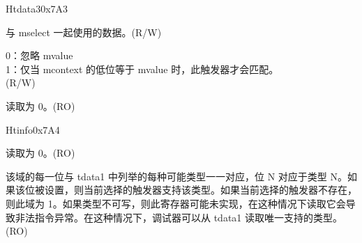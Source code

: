\begin{register}{H}{tdata3}{0x7A3}\label{regdesc:TDATA3}
%
%
%
\regnewline%
\begin{regdesc}\begin{reglist}
\label{fielddesc:MVALUE}\item [mvalue] 与 mselect 一起使用的数据。(R/W)
\label{fielddesc:MSELECT}\item [mselect] 
0：忽略 mvalue\\
1：仅当 mcontext 的低位等于 mvalue 时，此触发器才会匹配。\\
(R/W)
\label{fielddesc:tdata3_rsvd}\item [Reserved] 读取为 0。(RO)
\end{reglist}\end{regdesc}
\end{register}

\begin{register}{H}{tinfo}{0x7A4}\label{regdesc:TINFO}
%
%
\regnewline%
\begin{regdesc}\begin{reglist}
\label{fielddesc:tinfo_rsvd}\item [Reserved] 读取为 0。(RO)
\label{fielddesc:INFO}\item [info] 该域的每一位与 tdata1 中列举的每种可能类型一一对应，位 N 对应于类型 N。如果该位被设置，则当前选择的触发器支持该类型。如果当前选择的触发器不存在，则此域为 1。如果类型不可写，则此寄存器可能未实现，在这种情况下读取它会导致非法指令异常。在这种情况下，调试器可以从 tdata1 读取唯一支持的类型。(RO)
\end{reglist}\end{regdesc}
\end{register}

